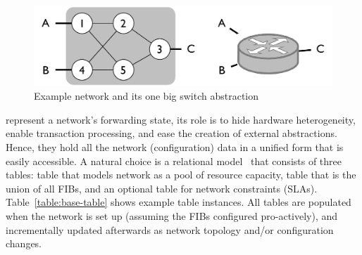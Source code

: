 \vspace{-.5em}
\begin{figure}[ht!]
  \centering
  \includegraphics[width=.95\linewidth]{eg-one-big-switch.pdf}
  \caption{\footnotesize Example network and its one big switch
    abstraction}
  \label{fig:eg-one-big-switch}
\end{figure}
\vspace{-1em}

 represent a network's
forwarding state, its role is to hide hardware heterogeneity, enable
transaction processing, and ease the creation of external
abstractions. Hence, they hold all the network
(configuration) data in a unified form that is easily accessible.  A
natural choice is a relational model~\cite{hull_relative_1984} that 
consists of three tables:  table that models network as a
pool of resource capacity,  table that is the union
of all FIBs, and an optional  table for 
network constraints (\eg SLAs).  \Eg Table~\ref{table:base-table}
shows example table instances.
All tables are populated when the network is set up (assuming the FIBs
configured pro-actively), and incrementally updated afterwards as
network topology and/or configuration changes.


